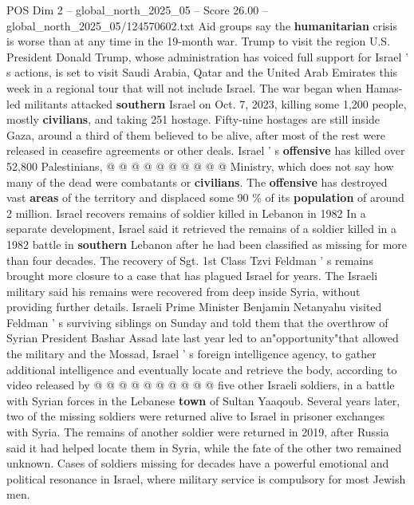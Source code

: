 \begin{textsample}{POS Dim 2 – global\_north\_2025\_05 – Score 26.00 – global\_north\_2025\_05/124570602.txt}
Aid groups say the \textbf{humanitarian} crisis is worse than at any time in the 19-month war.
Trump to visit the region U.S.
President Donald Trump, whose administration has voiced full support for Israel ' s actions, is set to visit Saudi Arabia, Qatar and the United Arab Emirates this week in a regional tour that will not include Israel.
The war began when Hamas-led militants attacked \textbf{southern} Israel on Oct. 7, 2023, killing some 1,200 people, mostly \textbf{civilians}, and taking 251 hostage.
Fifty-nine hostages are still inside Gaza, around a third of them believed to be alive, after most of the rest were released in ceasefire agreements or other deals.
Israel ' s \textbf{offensive} has killed over 52,800 Palestinians, @ @ @ @ @ @ @ @ @ @ Ministry, which does not say how many of the dead were combatants or \textbf{civilians}.
The \textbf{offensive} has destroyed vast \textbf{areas} of the territory and displaced some 90 \% of its \textbf{population} of around 2 million.
Israel recovers remains of soldier killed in Lebanon in 1982 In a separate development, Israel said it retrieved the remains of a soldier killed in a 1982 battle in \textbf{southern} Lebanon after he had been classified as missing for more than four decades.
The recovery of Sgt. 1st Class Tzvi Feldman ' s remains brought more closure to a case that has plagued Israel for years.
The Israeli military said his remains were recovered from deep inside Syria, without providing further details.
Israeli Prime Minister Benjamin Netanyahu visited Feldman ' s surviving siblings on Sunday and told them that the overthrow of Syrian President Bashar Assad late last year led to an"opportunity"that allowed the military and the Mossad, Israel ' s foreign intelligence agency, to gather additional intelligence and eventually locate and retrieve the body, according to video released by @ @ @ @ @ @ @ @ @ @ five other Israeli soldiers, in a battle with Syrian forces in the Lebanese \textbf{town} of Sultan Yaaqoub.
Several years later, two of the missing soldiers were returned alive to Israel in prisoner exchanges with Syria.
The remains of another soldier were returned in 2019, after Russia said it had helped locate them in Syria, while the fate of the other two remained unknown.
Cases of soldiers missing for decades have a powerful emotional and political resonance in Israel, where military service is compulsory for most Jewish men.

\end{textsample}
